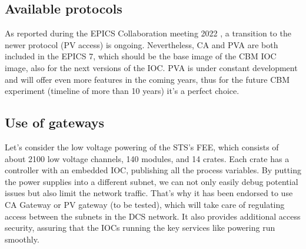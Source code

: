 \subsection{Available protocols}
As reported during the EPICS Collaboration meeting 2022 \cite{epics_2022}, a transition to the newer protocol (PV access) is ongoing. Nevertheless, CA and PVA are both included in the EPICS 7, which should be the base image of the CBM IOC image, also for the next versions of the IOC. PVA is under constant development and will offer even more features in the coming years, thus for the future CBM experiment (timeline of more than 10 years) it's a perfect choice. 

\subsection{Use of gateways}
Let's consider the low voltage powering of the STS's FEE, which consists of about 2100 low voltage channels, 140 modules, and 14 crates. Each crate has a controller with an embedded \gls{IOC}, publishing all the process variables. By putting the power supplies into a different subnet, we can not only easily debug potential issues but also limit the network traffic. That's why it has been endorsed to use CA Gateway \cite{gateway} or PV gateway (to be tested), which will take care of regulating access between the subnets in the DCS network. It also provides additional access security, assuring that the IOCs running the key services like powering run smoothly.

